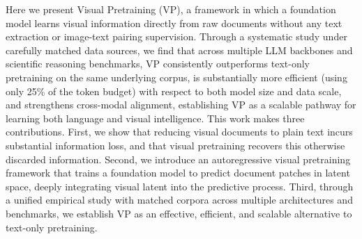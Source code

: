 

Here we present Visual Pretraining (VP), a framework in which a
foundation model learns visual information directly from raw documents without any text extraction or image-text pairing supervision.
Through a systematic study under carefully matched data sources, we
find that across multiple LLM backbones and scientific reasoning benchmarks, VP
consistently outperforms text-only pretraining on the same underlying corpus, is
substantially more efficient (using only 25\% of the token budget) with respect to both model size and data scale, 
and strengthens cross-modal alignment, establishing VP as a scalable pathway for
learning both language and visual intelligence.
This work makes three contributions. 
First, we show that reducing visual documents to plain text incurs substantial information loss, 
and that visual pretraining recovers this otherwise discarded information.
Second, we introduce an autoregressive visual pretraining framework that trains a foundation model to predict document patches in latent space, 
deeply integrating visual latent into the predictive process. 
Third, through a unified empirical study with matched corpora across multiple architectures and
benchmarks, we establish VP as an effective, efficient, and scalable alternative to text-only pretraining.

